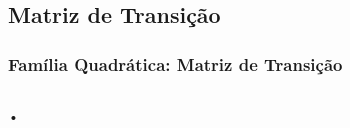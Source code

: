 \subsection{Matriz de Transição}


\begin{frame}
\vspace{5pt}
\frametitle{Família Quadrática: Matriz de Transição}
\begin{columns}
\column{\dimexpr\paperwidth-15pt}

•

\end{columns}
\end{frame}
